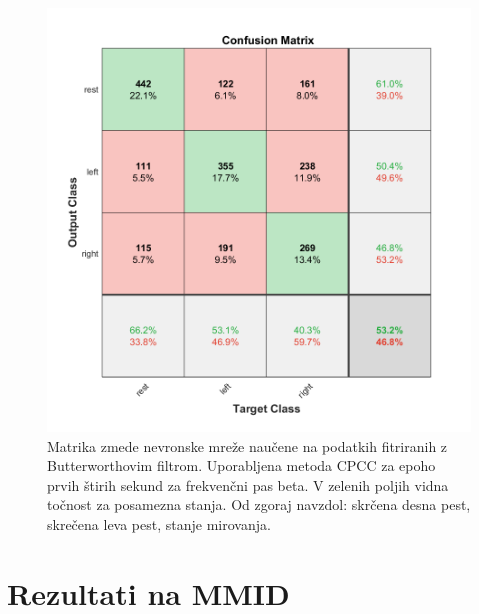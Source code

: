 \begin{figure}
    \begin{center}
    \includegraphics[width=0.8\linewidth]{slike/Confusion my CPCC at 13-20 Hz.png}
    \end{center}
    \caption{Matrika zmede nevronske mreže naučene na podatkih fitriranih z Butterworthovim filtrom. Uporabljena metoda CPCC za epoho prvih štirih sekund za frekvenčni pas beta. V zelenih poljih vidna točnost za posamezna stanja. Od zgoraj navzdol: skrčena desna pest, skrečena leva pest, stanje mirovanja.}
    
    \label{slika:butterwothov_filter_matrika}
    \end{figure}

\section{Rezultati na MMID}
